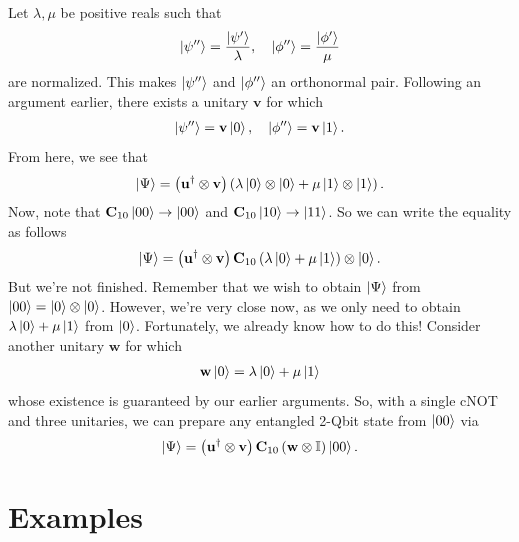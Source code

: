 \documentclass{book}
\theoremstyle{definition}
\newcommand{\f}[2]{\frac{#1}{#2}}
\newcommand{\lp}{\left(}
\newcommand{\rp}{\right)}
\newcommand{\Id}{\mathbb{I}}
\begin{document}
Let $\lambda, \mu$ be positive reals such that 
\begin{align}
\ket{\psi''} = \f{\ket{\psi'}}{\lambda}, \quad \ket{\phi''} = \f{\ket{\phi'}}{\mu}
\end{align}
are normalized. This makes $\ket{\psi''}$ and $\ket{\phi''}$ an orthonormal pair. Following an argument earlier, there exists a unitary $\mathbf{v}$ for which 
\begin{align}
\ket{\psi''} = \mathbf{v}\ket{0}, \quad \ket{\phi''} = \mathbf{v}\ket{1}.
\end{align} 
From here, we see that 
\begin{align}
\ket{\Psi} = \lp \mathbf{u}^\dagger \otimes \mathbf{v} \rp\lp \lambda\ket{0}\otimes \ket{0} + \mu\ket{1}\otimes \ket{1} \rp.
\end{align}
Now, note that $\mathbf{C}_{10}\ket{00} \to \ket{00}$ and $\mathbf{C}_{10}\ket{10} \to \ket{11}$. So we can write the equality as follows
\begin{align}
\ket{\Psi} = \lp \mathbf{u}^\dagger \otimes \mathbf{v} \rp \mathbf{C}_{10} \lp \lambda\ket{0} + \mu\ket{1}\rp\otimes \ket{0}.
\end{align}
But we're not finished. Remember that we wish to obtain $\ket{\Psi}$ from $\ket{00} = \ket{0}\otimes \ket{0}$. However, we're very close now, as we only need to obtain $\lambda\ket{0} + \mu\ket{1}$ from $\ket{0}$. Fortunately, we already know how to do this! Consider another unitary $\mathbf{w}$ for which 
\begin{align}
\mathbf{w}\ket{0} = \lambda\ket{0} + \mu\ket{1}
\end{align}
whose existence is guaranteed by our earlier arguments. So, with a single cNOT and three unitaries, we can prepare any entangled 2-Qbit state from $\ket{00}$ via
\begin{align}
\ket{\Psi} = \lp \mathbf{u}^\dagger \otimes \mathbf{v} \rp \mathbf{C}_{10}\lp\mathbf{w}\otimes \Id\rp\ket{00}.
\end{align}












\newpage



\section{Examples}
\end{document}
